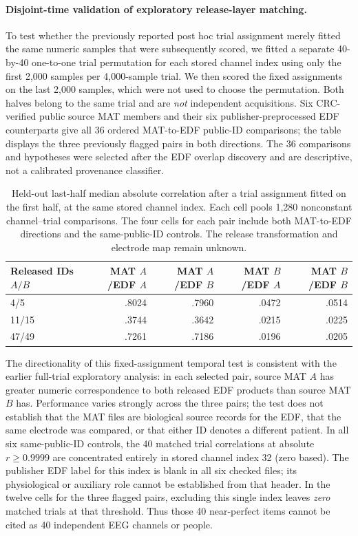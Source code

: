 \paragraph{Disjoint-time validation of exploratory release-layer matching.}
To test whether the previously reported post hoc trial assignment
merely fitted the same numeric samples that were subsequently scored,
we fitted a separate 40-by-40 one-to-one trial permutation for each
stored channel index using only the first 2,000 samples per 4,000-sample
trial. We then scored the fixed assignments on the last 2,000 samples,
which were not used to choose the permutation. Both halves belong to
the same trial and are \emph{not} independent acquisitions. Six
CRC-verified public source MAT members and their six publisher-preprocessed
EDF counterparts give all 36 ordered MAT-to-EDF public-ID comparisons;
the table displays the three previously flagged pairs in both directions.
The 36 comparisons and hypotheses were selected after the EDF overlap
discovery and are descriptive, not a calibrated provenance classifier.

\begin{table}[h!]\centering\small
\caption{Held-out last-half median absolute correlation after a trial
assignment fitted on the first half, at the same stored channel index.
Each cell pools 1,280 nonconstant channel--trial comparisons. The
four cells for each pair include both MAT-to-EDF directions and the
same-public-ID controls. The release transformation and electrode
map remain unknown.}
\label{tab:p2-heldout-temporal}
\begin{tabular}{lrrrr}
\toprule
Released IDs $A/B$ & MAT $A$/EDF $A$ & MAT $A$/EDF $B$ &
MAT $B$/EDF $A$ & MAT $B$/EDF $B$\\
\midrule
4/5   & .8024 & .7960 & .0472 & .0514\\
11/15 & .3744 & .3642 & .0215 & .0225\\
47/49 & .7261 & .7186 & .0196 & .0205\\
\bottomrule
\end{tabular}
\end{table}

The directionality of this fixed-assignment temporal test is consistent
with the earlier full-trial exploratory analysis: in each selected pair,
source MAT $A$ has greater numeric correspondence to both released EDF
products than source MAT $B$ has. Performance varies strongly across
the three pairs; the test does not establish that the MAT files are
biological source records for the EDF, that the same electrode was
compared, or that either ID denotes a different patient. In all six
same-public-ID controls, the 40 matched trial correlations at absolute
$r\geq0.9999$ are concentrated entirely in stored channel index 32
(zero based). The publisher EDF label for this index is blank in all
six checked files; its physiological or auxiliary role cannot be
established from that header. In the twelve cells for the
three flagged pairs, excluding this single index leaves \emph{zero}
matched trials at that threshold. Thus those 40 near-perfect items
cannot be cited as 40 independent EEG channels or people.

